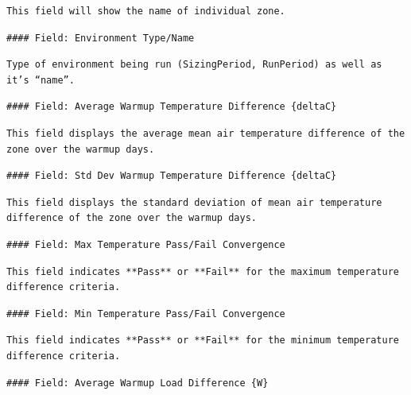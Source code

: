 \begin{lstlisting}
This field will show the name of individual zone.
\end{lstlisting}

\begin{lstlisting}
#### Field: Environment Type/Name
\end{lstlisting}

\begin{lstlisting}
Type of environment being run (SizingPeriod, RunPeriod) as well as it’s “name”.
\end{lstlisting}

\begin{lstlisting}
#### Field: Average Warmup Temperature Difference {deltaC}
\end{lstlisting}

\begin{lstlisting}
This field displays the average mean air temperature difference of the zone over the warmup days.
\end{lstlisting}

\begin{lstlisting}
#### Field: Std Dev Warmup Temperature Difference {deltaC}
\end{lstlisting}

\begin{lstlisting}
This field displays the standard deviation of mean air temperature difference of the zone over the warmup days.
\end{lstlisting}

\begin{lstlisting}
#### Field: Max Temperature Pass/Fail Convergence
\end{lstlisting}

\begin{lstlisting}
This field indicates **Pass** or **Fail** for the maximum temperature difference criteria.
\end{lstlisting}

\begin{lstlisting}
#### Field: Min Temperature Pass/Fail Convergence
\end{lstlisting}

\begin{lstlisting}
This field indicates **Pass** or **Fail** for the minimum temperature difference criteria.
\end{lstlisting}

\begin{lstlisting}
#### Field: Average Warmup Load Difference {W}
\end{lstlisting}

